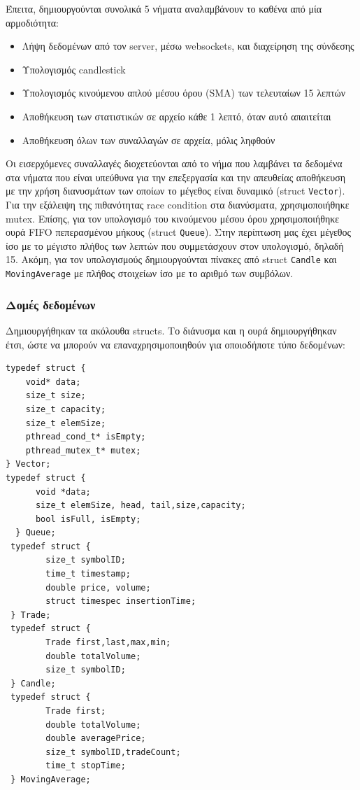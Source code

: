 \documentclass[11pt]{article}
\begin{document}
Έπειτα, δημιουργούνται συνολικά 5 νήματα αναλαμβάνουν το καθένα από μία αρμοδιότητα:
\begin{itemize}
\item Λήψη δεδομένων από τον server, μέσω websockets, και διαχείρηση της σύνδεσης
\item Υπολογισμός candlestick
\item Υπολογισμός κινούμενου απλού μέσου όρου (SMA) των τελευταίων 15 λεπτών
\item Αποθήκευση των στατιστικών σε αρχείο κάθε 1 λεπτό, όταν αυτό απαιτείται
\item Αποθήκευση όλων των συναλλαγών σε αρχεία, μόλις ληφθούν
\end{itemize}

Οι εισερχόμενες συναλλαγές διοχετεύονται από το νήμα που λαμβάνει τα δεδομένα στα νήματα που είναι υπεύθυνα για την επεξεργασία και την απευθείας αποθήκευση με την χρήση διανυσμάτων των οποίων το μέγεθος είναι δυναμικό (struct \texttt{Vector}). Για την εξάλειψη της πιθανότητας race condition στα διανύσματα, χρησιμοποιήθηκε mutex. Επίσης, για τον υπολογισμό του κινούμενου μέσου όρου χρησιμοποιήθηκε ουρά FIFO πεπερασμένου μήκους (struct \texttt{Queue}). Στην περίπτωση μας έχει μέγεθος ίσο με το μέγιστο πλήθος των λεπτών που συμμετάσχουν στον υπολογισμό, δηλαδή 15. Ακόμη, για τον υπολογισμούς δημιουργούνται πίνακες από struct \texttt{Candle} και \texttt{MovingAverage} με πλήθος στοιχείων ίσο με το αριθμό των συμβόλων.

\subsubsection{Δομές δεδομένων}
\label{sec:org0253b7c}
Δημιουργήθηκαν τα ακόλουθα structs. Το διάνυσμα και η ουρά δημιουργήθηκαν έτσι, ώστε να μπορούν να επαναχρησιμοποιηθούν για οποιοδήποτε τύπο δεδομένων:
\begin{verbatim}
typedef struct {
    void* data;
    size_t size;
    size_t capacity;
    size_t elemSize;
    pthread_cond_t* isEmpty;
    pthread_mutex_t* mutex;
} Vector;
typedef struct {
      void *data;
      size_t elemSize, head, tail,size,capacity;
      bool isFull, isEmpty;
  } Queue;
 typedef struct {
        size_t symbolID;
        time_t timestamp;
        double price, volume;
        struct timespec insertionTime;
 } Trade;
 typedef struct {
        Trade first,last,max,min;
        double totalVolume;
        size_t symbolID;
 } Candle;
 typedef struct {
        Trade first;
        double totalVolume;
        double averagePrice;
        size_t symbolID,tradeCount;
        time_t stopTime;
 } MovingAverage;
\end{verbatim}
\end{document}

